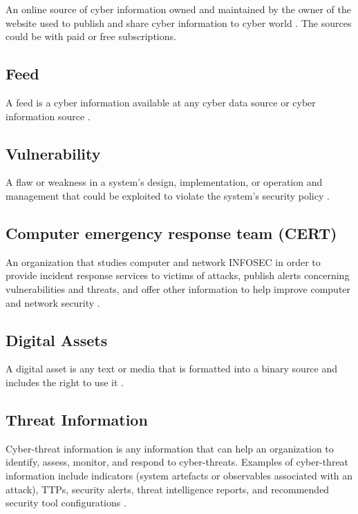 An online source of cyber information owned and 
maintained by the owner of the website 
used to publish and share cyber information 
to cyber world 
\citep{eu2014cyber}. 
The sources could be with paid or free subscriptions.

\subsection{Feed}

A feed is a cyber information 
available at any cyber data source 
or cyber information source 
\citep{eu2014cyber}. 

\subsection{Vulnerability}	

A flaw or weakness in a system's design, implementation, 
or operation and management 
that could be exploited to violate the system's security policy
\citep[page 189]{RFC2828}.

\subsection{Computer emergency response team (CERT)}

An organization that studies computer and 
network INFOSEC in order to provide incident response services 
to victims of attacks, 
publish alerts concerning vulnerabilities and threats, 
and offer other information to help improve computer and network security
\citep[page 41]{RFC2828}.

\subsection{Digital Assets}

A digital asset is any text or media 
that is formatted into a binary source 
and includes the right to use it 
\citep{toygar2013new}.

\subsection{Threat Information}	

Cyber-threat information is any information 
that can help an organization to identify, assess, monitor,
and respond to cyber-threats. 
Examples of cyber-threat information include indicators 
(system artefacts
or observables associated with an attack), 
TTPs, security alerts, threat intelligence reports, 
and
recommended security tool configurations 
\citep{johnson2017cyber}.

